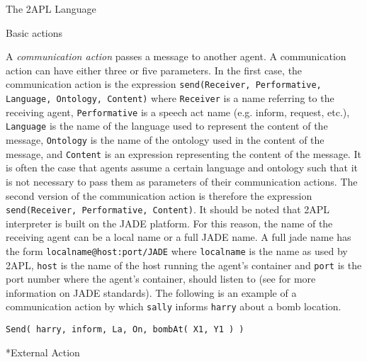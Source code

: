 \begin{chapter}{The 2APL Language}
\begin{section}{Basic actions}
\begin{subsection}
A \emph{communication action} passes a message to another agent. A
communication action  can have either three or five
parameters. In the first case, the communication action is the
expression {\tt send(Receiver, Performative, Language, Ontology,
Content)} where {\tt Receiver} is a name referring to the receiving
agent, {\tt Performative} is a speech act name (e.g. inform,
request, etc.), {\tt Language} is the name of the language used to
represent the content of the message, {\tt Ontology} is the name of
the ontology used in the content of the message, and {\tt Content}
is an expression representing the content of the message. It is
often the case that agents assume a certain language and ontology
such that it is not necessary to pass them as parameters of their
communication actions. The second version of the communication
action is therefore the expression {\tt send(Receiver, Performative,
Content)}. It should be noted that 2APL interpreter is built on the
JADE platform. For this reason, the name of the receiving agent can
be a local name or a full JADE name. A full jade name has the form
{\tt localname@host:port/JADE} where {\tt localname} is the name as
used by 2APL, {\tt host} is the name of the host running the agent's
container and {\tt port} is the port number where the agent's
container, should listen to (see \cite{jade2005} for more
information on JADE standards). The following is an example of a
communication action by which {\tt sally} informs {\tt harry} about
a bomb location.

\begin{verbatim}
Send( harry, inform, La, On, bombAt( X1, Y1 ) )
\end{verbatim}

\end{subsection}


\begin{subsection}*{External Action}\label{sec:externalaction}


\end{subsection}
\end{section}
\end{chapter}

